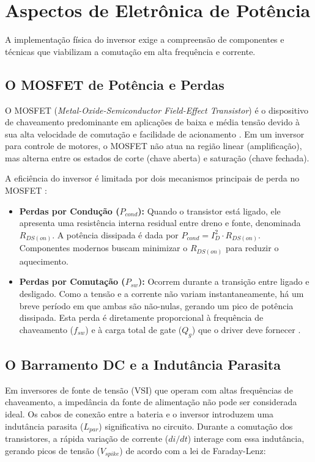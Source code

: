 \documentclass[12pt, a4paper, openright, oneside, brazilian]{abntex2}
\begin{document}
\section{Aspectos de Eletrônica de Potência}

A implementação física do inversor exige a compreensão de componentes e técnicas que viabilizam a comutação em alta frequência e corrente.

\subsection{O MOSFET de Potência e Perdas}
O MOSFET (\textit{Metal-Oxide-Semiconductor Field-Effect Transistor}) é o dispositivo de chaveamento predominante em aplicações de baixa e média tensão devido à sua alta velocidade de comutação e facilidade de acionamento \cite{rashid2014power}. Em um inversor para controle de motores, o MOSFET não atua na região linear (amplificação), mas alterna entre os estados de corte (chave aberta) e saturação (chave fechada).

A eficiência do inversor é limitada por dois mecanismos principais de perda no MOSFET \cite{kim2017electric}:
\begin{itemize}
    \item \textbf{Perdas por Condução ($P_{cond}$):} Quando o transistor está ligado, ele apresenta uma resistência interna residual entre dreno e fonte, denominada $R_{DS(on)}$. A potência dissipada é dada por $P_{cond} = I_{D}^2 \cdot R_{DS(on)}$. Componentes modernos buscam minimizar o $R_{DS(on)}$ para reduzir o aquecimento.
    \item \textbf{Perdas por Comutação ($P_{sw}$):} Ocorrem durante a transição entre ligado e desligado. Como a tensão e a corrente não variam instantaneamente, há um breve período em que ambas são não-nulas, gerando um pico de potência dissipada. Esta perda é diretamente proporcional à frequência de chaveamento ($f_{sw}$) e à carga total de gate ($Q_g$) que o driver deve fornecer \cite{rashid2014power}.
\end{itemize}

\subsection{O Barramento DC e a Indutância Parasita}

Em inversores de fonte de tensão (VSI) que operam com altas frequências de chaveamento, a impedância da fonte de alimentação não pode ser considerada ideal. Os cabos de conexão entre a bateria e o inversor introduzem uma indutância parasita ($L_{par}$) significativa no circuito. Durante a comutação dos transistores, a rápida variação de corrente ($di/dt$) interage com essa indutância, gerando picos de tensão ($V_{spike}$) de acordo com a lei de Faraday-Lenz:
\end{document}
